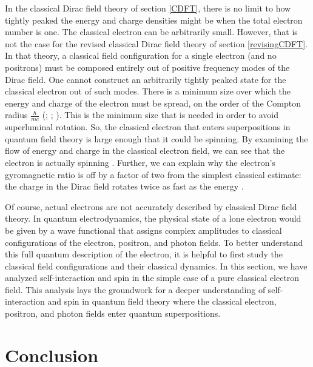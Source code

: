 \documentclass[12pt,secnumarabic,amsmath,amssymb,balancelastpage,nofootinbib]{article}
\begin{document}
In the classical Dirac field theory of section \ref{CDFT}, there is no limit to how tightly peaked the energy and charge densities might be when the total electron number is one.  The classical electron can be arbitrarily small.  However, that is not the case for the revised classical Dirac field theory of section \ref{revisingCDFT}.  In that theory, a classical field configuration for a single electron (and no positrons) must be composed entirely out of positive frequency modes of the Dirac field.  One cannot construct an arbitrarily tightly peaked state for the classical electron out of such modes.  There is a minimum size over which the energy and charge of the electron must be spread, on the order of the Compton radius $\frac{\hbar}{m c}$ (\citealp{newton1949}; \citealp[pg.\ 299]{heitler}; \citealp[pg.\ 39]{bjorkendrell}).  This is the minimum size that is needed in order to avoid superluminal rotation.  So, the classical electron that enters superpositions in quantum field theory is large enough that it could be spinning.  By examining the flow of energy and charge in the classical electron field, we can see that the electron is actually spinning \citep{ohanian, chuu2007, howelectronsspin}.  Further, we can explain why the electron's gyromagnetic ratio is off by a factor of two from the simplest classical estimate: the charge in the Dirac field rotates twice as fast as the energy \citep{howelectronsspin}.

Of course, actual electrons are not accurately described by classical Dirac field theory.  In quantum electrodynamics, the physical state of a lone electron would be given by a wave functional that assigns complex amplitudes to classical configurations of the electron, positron, and photon fields.  To better understand this full quantum description of the electron, it is helpful to first study the classical field configurations and their classical dynamics.  In this section, we have analyzed self-interaction and spin in the simple case of a pure classical electron field.  This analysis lays the groundwork for a deeper understanding of self-interaction and spin in quantum field theory where the classical electron, positron, and photon fields enter quantum superpositions.






\section{Conclusion}
\end{document}

